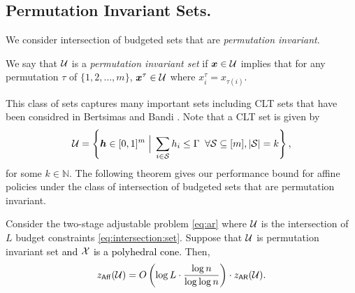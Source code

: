 \documentclass[moor]{informs1}              %
\newcommand{\mb}[1]{\ensuremath{\boldsymbol{#1}}}
\newcommand*{\red}{\textcolor{black}}
\begin{document}
\subsection{Permutation Invariant Sets.}
We consider intersection of budgeted  sets that are \textit{permutation invariant}. 
\begin{definition} \label{def:perm}
We say that ${\cal U}$ is a  \textit{permutation invariant set} if $\mb{x}\in{\cal U}$ implies that for any permutation $\tau$ of $\{1,2,\ldots,m\}$, $\mb{x}^{\tau}\in{\cal U}$ where $x^\tau_i= x_{\tau(i)}$.
\end{definition}
This class of sets captures many important sets including CLT sets that have been considred in Bertsimas and Bandi \cite{bandi2012tractable}. Note that a CLT set is given by
\begin{equation} \label{CLT:sets}
{\cal U} = \left\{ \mb h \in [0,1]^m  \; \Big\vert \;   \sum_{i \in {\cal S}} h_i \leq \Gamma  \;\;  \forall { \cal S} \subseteq [m], \vert {\cal S} \vert =k \right\},
\end{equation}
for some $k \in \mathbb{N}$. The following theorem gives our performance bound for affine policies under the class of intersection of budgeted sets that are permutation invariant.


\begin{theorem}\label{thm:permutation-inv}
Consider the two-stage adjustable problem \eqref{eq:ar} where $ {\cal U}$ is the intersection of $L$ budget constraints \eqref{eq:intersection:set}.  Suppose that $\cal U$ is permutation invariant set \red{and $\cal X$ is a polyhedral cone.}  Then,
$$ z_{\sf Aff}({\cal U}) = O \left( \log L \cdot \frac{\log n}{\log \log n} \right) \cdot z_{\sf AR}({\cal U}) .$$
\end{theorem}
\end{document}
